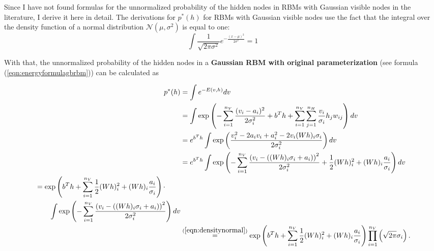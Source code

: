 \documentclass[12pt]{article}
\begin{document}
Since I have not found formulas for the unnormalized probability of the hidden nodes in RBMs with Gaussian visible nodes in the literature, I derive it here in detail.
The derivations for $p^*(h)$ for RBMs with Gaussian visible nodes use the fact that the integral over the density function of a normal distribution $\mathcal{N}(\mu, \sigma^2)$ is equal to one:
\begin{equation} \int \frac{1}{\sqrt{2 \pi \sigma^2}} e^{ -\frac{(x - \mu)^2}{2 \sigma^2}} = 1
\label{eqn:densitynormal}
\end{equation}

With that, the unnormalized probability of the hidden nodes in a {\bf Gaussian RBM with original parameterization} (see formula (\ref{eqn:energyformulagbrbm})) can be calculated as

\begin{align*}
   p^*(h) &= \int e^{-E \left(v,h \right)} dv \\
   &= \int \exp \left( -\sum_{i=1}^{n_V}\frac{(v_i - a_i)^2}{2\sigma_i^2} + b^T h + \sum_{i=1}^{n_V} \sum_{j=1}^{n_H} \frac{v_i}{\sigma_i}h_j w_{ij} \right) dv\\
   &= e^{b^T h} \int \exp \left( \frac{v_i^2 -2 a_i v_i + a_i^2 - 2 v_i (Wh)_i \sigma_i}{2 \sigma_i^2} \right) dv \\
   &= e^{b^T h} \int \exp \left(
      - \sum_{i=1}^{n_V} \frac{{\left( v_i - \left( (Wh)_i \sigma_i + a_i \right) \right)}^2}{2\sigma_i^2} + \frac{1}{2}(Wh)_i^2 + (Wh)_i \frac{a_i}{\sigma_i} \right ) dv \\
   \begin{split}
      &= \exp \left(b^T h + \sum_{i=1}^{n_V} \frac{1}{2}(Wh)_i^2 + (Wh)_i \frac{a_i}{\sigma_i} \right ) \cdot \\
      & \quad \quad \int \exp \left ( - \sum_{i=1}^{n_V} \frac{{\left( v_i - ((Wh)_i \sigma_i + a_i) \right)}^2}{2\sigma_i^2} \right) dv
   \end{split} \\
   & \stackrel{(\ref{eqn:densitynormal})}{=} \exp \left( b^T h + \sum_{i=1}^{n_V} \frac{1}{2}(Wh)_i^2 + (Wh)_i \frac{a_i}{\sigma_i} \right ) \prod_{i=1}^{n_V}\left(\sqrt{2\pi} \sigma_i\right). \\
\end{align*}
\end{document}
